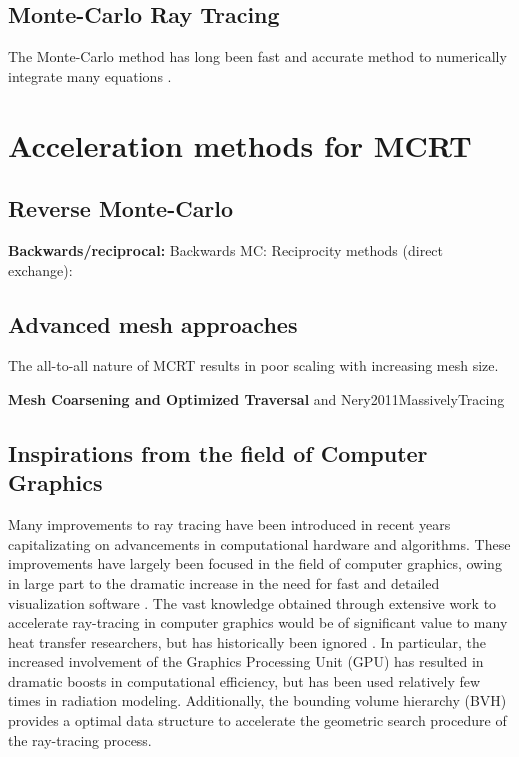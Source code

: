 \subsection{Monte-Carlo Ray Tracing}
The Monte-Carlo method has long been fast and accurate method to numerically integrate many equations \cite{Howell2021TheTransfer}.

\section{Acceleration methods for MCRT}

\subsection{Reverse Monte-Carlo}

\textbf{Backwards/reciprocal:}
Backwards MC: \cite{Modest2003BackwardTransfer,Walters1992RigorousMedia}
Reciprocity methods (direct exchange): \cite{Tesse2002RadiativeApproach}



\subsection{Advanced mesh approaches}
The all-to-all nature of MCRT results in poor scaling with increasing mesh size. 


\textbf{Mesh Coarsening and Optimized Traversal}
and \citet{Kelm2021TheTransport}
Nery2011MassivelyTracing


\subsection{Inspirations from the field of Computer Graphics}
Many improvements to ray tracing have been introduced in recent years capitalizating on advancements in computational hardware and algorithms.
These improvements have largely been focused in the field of computer graphics, owing in large part to the dramatic increase in the need for fast and detailed visualization software \cite{Gupta2020CUDAComputing}. 
The vast knowledge obtained through extensive work to accelerate ray-tracing in computer graphics would be of significant value to many heat transfer researchers, but has historically been ignored \cite{Howell2021TheTransfer}. 
In particular, the increased involvement of the Graphics Processing Unit (GPU) has resulted in dramatic boosts in computational efficiency, but has been used relatively few times in radiation modeling.
Additionally, the bounding volume hierarchy (BVH) provides a optimal data structure to accelerate the geometric search procedure of the ray-tracing process.

